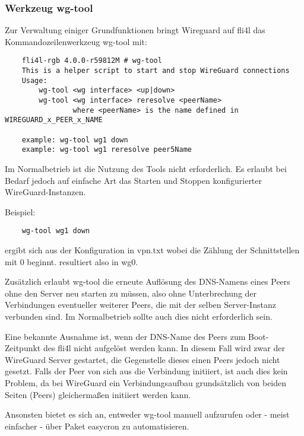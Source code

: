 \subsubsection{Werkzeug wg-tool}

Zur Verwaltung einiger Grundfunktionen bringt Wireguard auf fli4l das 
Kommandozeilenwerkzeug wg-tool mit:

\begin{example}
\begin{verbatim}
    fli4l-rgb 4.0.0-r59812M # wg-tool
    This is a helper script to start and stop WireGuard connections
    Usage:
        wg-tool <wg interface> <up|down>
        wg-tool <wg interface> reresolve <peerName>
                where <peerName> is the name defined in WIREGUARD_x_PEER_x_NAME

    example: wg-tool wg1 down
    example: wg-tool wg1 reresolve peer5Name
\end{verbatim}
\end{example}

Im Normalbetrieb ist die Nutzung des Tools nicht erforderlich. Es erlaubt bei 
Bedarf jedoch auf einfache Art das Starten und Stoppen konfigurierter 
WireGuard-Instanzen.

Beispiel:
\begin{example}
\begin{verbatim}
    wg-tool wg1 down
\end{verbatim}
\end{example}

 ergibt sich aus der Konfiguration in vpn.txt wobei die Zählung 
der Schnittstellen mit 0 beginnt.  resultiert also in wg0.

Zusätzlich erlaubt wg-tool die erneute Auflösung des DNS-Namens eines Peers ohne 
den Server neu starten zu müssen, also ohne Unterbrechung der Verbindungen 
eventueller weiterer Peers, die mit der selben Server-Instanz verbunden sind. Im 
Normalbetrieb sollte auch dies nicht erforderlich sein. 

Eine bekannte Ausnahme ist, wenn der DNS-Name des Peers zum Boot-Zeitpunkt des fli4l 
nicht aufgelöst werden kann. In diesem Fall wird zwar der WireGuard Server gestartet, 
die Gegenstelle dieses einen Peers jedoch nicht gesetzt. Falls der Peer von sich 
aus die Verbindung initiiert, ist auch dies kein Problem, da bei WireGuard ein 
Verbindungsaufbau grundsätzlich von beiden Seiten (Peers) gleichermaßen initiiert 
werden kann.

Ansonsten bietet es sich an, entweder wg-tool manuell aufzurufen oder - meist 
einfacher - über Paket easycron zu automatisieren.

